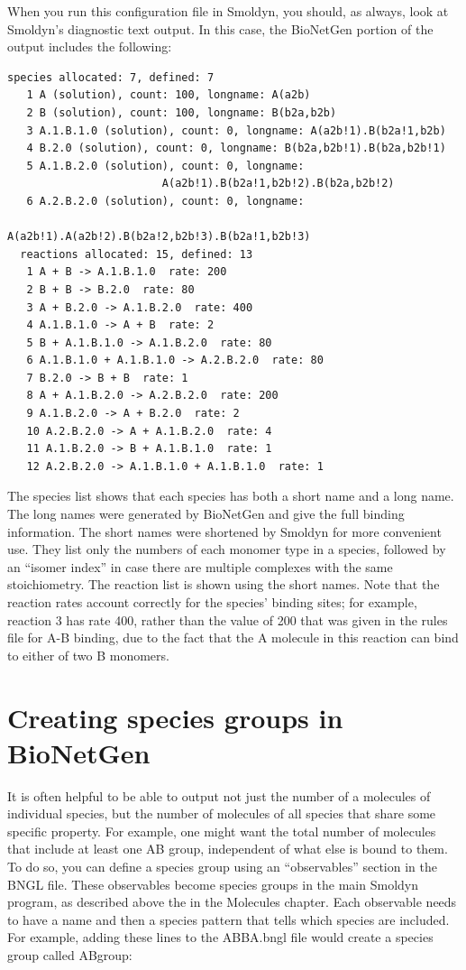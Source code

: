 \documentclass {book}
\begin{document}
When you run this configuration file in Smoldyn, you should, as always, look at Smoldyn's diagnostic text output. In this case, the BioNetGen portion of the output includes the following:

\begin{lstlisting}[style=SSAC]
 species allocated: 7, defined: 7
   1 A (solution), count: 100, longname: A(a2b)
   2 B (solution), count: 100, longname: B(b2a,b2b)
   3 A.1.B.1.0 (solution), count: 0, longname: A(a2b!1).B(b2a!1,b2b)
   4 B.2.0 (solution), count: 0, longname: B(b2a,b2b!1).B(b2a,b2b!1)
   5 A.1.B.2.0 (solution), count: 0, longname:
						A(a2b!1).B(b2a!1,b2b!2).B(b2a,b2b!2)
   6 A.2.B.2.0 (solution), count: 0, longname:
						A(a2b!1).A(a2b!2).B(b2a!2,b2b!3).B(b2a!1,b2b!3)
  reactions allocated: 15, defined: 13
   1 A + B -> A.1.B.1.0  rate: 200
   2 B + B -> B.2.0  rate: 80
   3 A + B.2.0 -> A.1.B.2.0  rate: 400
   4 A.1.B.1.0 -> A + B  rate: 2
   5 B + A.1.B.1.0 -> A.1.B.2.0  rate: 80
   6 A.1.B.1.0 + A.1.B.1.0 -> A.2.B.2.0  rate: 80
   7 B.2.0 -> B + B  rate: 1
   8 A + A.1.B.2.0 -> A.2.B.2.0  rate: 200
   9 A.1.B.2.0 -> A + B.2.0  rate: 2
   10 A.2.B.2.0 -> A + A.1.B.2.0  rate: 4
   11 A.1.B.2.0 -> B + A.1.B.1.0  rate: 1
   12 A.2.B.2.0 -> A.1.B.1.0 + A.1.B.1.0  rate: 1
\end{lstlisting}

The species list shows that each species has both a short name and a long name. The long names were generated by BioNetGen and give the full binding information. The short names were shortened by Smoldyn for more convenient use. They list only the numbers of each monomer type in a species, followed by an ``isomer index'' in case there are multiple complexes with the same stoichiometry. The reaction list is shown using the short names. Note that the reaction rates account correctly for the species' binding sites; for example, reaction 3 has rate 400, rather than the value of 200 that was given in the rules file for A-B binding, due to the fact that the A molecule in this reaction can bind to either of two B monomers.

\section{Creating species groups in BioNetGen}

It is often helpful to be able to output not just the number of a molecules of individual species, but the number of molecules of all species that share some specific property. For example, one might want the total number of molecules that include at least one AB group, independent of what else is bound to them. To do so, you can define a species group using an ``observables'' section in the BNGL file. These observables become species groups in the main Smoldyn program, as described above the in the Molecules chapter. Each observable needs to have a name and then a species pattern that tells which species are included. For example, adding these lines to the ABBA.bngl file would create a species group called ABgroup:
\end{document}
